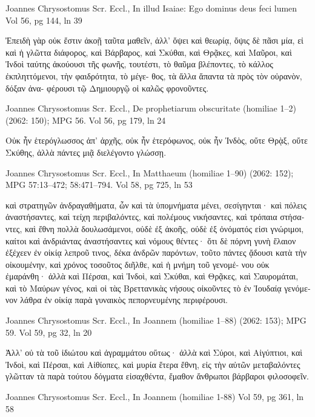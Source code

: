\documentclass[12pt,letterpaper,twoside,final]{memoir}
\begin{document}
\begin{greek}
Joannes Chrysostomus Scr. Eccl., In illud Isaiae: Ego dominus deus feci lumen 
Vol 56, pg 144, ln 39

                            Ἐπειδὴ γὰρ οὐκ ἔστιν ἀκοῇ 
ταῦτα μαθεῖν, ἀλλ' ὄψει καὶ θεωρίᾳ, ὄψις δὲ πᾶσι 
μία, εἰ καὶ ἡ γλῶττα διάφορος, καὶ Βάρβαρος, καὶ 
Σκύθαι, καὶ Θρᾷκες, καὶ Μαῦροι, καὶ Ἰνδοὶ ταύτης 
ἀκούουσι τῆς φωνῆς, τουτέστι, τὸ θαῦμα βλέποντες, 
τὸ κάλλος ἐκπληττόμενοι, τὴν φαιδρότητα, τὸ μέγε-
θος, τὰ ἄλλα ἅπαντα τὰ πρὸς τὸν οὐρανὸν, δόξαν ἀνα-
φέρουσι τῷ Δημιουργῷ οἱ καλῶς φρονοῦντες. 



Joannes Chrysostomus Scr. Eccl., De prophetiarum obscuritate (homiliae 1–2) (2062: 150); MPG 56.
Vol 56, pg 179, ln 24

                                   Οὐκ ἦν ἑτερόγλωσσος 
ἀπ' ἀρχῆς, οὐκ ἦν ἑτερόφωνος, οὐκ ἦν Ἰνδὸς, οὔτε 
Θρᾲξ, οὔτε Σκύθης, ἀλλὰ πάντες μιᾷ διελέγοντο 
γλώσσῃ. 



Joannes Chrysostomus Scr. Eccl., In Matthaeum (homiliae 1–90) (2062: 152); MPG 57:13–472; 58:471–794.
Vol 58, pg 725, ln 53

καὶ στρατηγῶν ἀνδραγαθήματα, ὧν καὶ τὰ ὑπομνήματα 
μένει, σεσίγηνται· καὶ πόλεις ἀναστήσαντες, καὶ τείχη 
περιβαλόντες, καὶ πολέμους νικήσαντες, καὶ τρόπαια 
στήσαντες, καὶ ἔθνη πολλὰ δουλωσάμενοι, οὐδὲ ἐξ ἀκοῆς, 
οὐδὲ ἐξ ὀνόματός εἰσι γνώριμοι, καίτοι καὶ ἀνδριάντας 
ἀναστήσαντες καὶ νόμους θέντες· ὅτι δὲ πόρνη γυνὴ 
ἔλαιον ἐξέχεεν ἐν οἰκίᾳ λεπροῦ τινος, δέκα ἀνδρῶν 
παρόντων, τοῦτο πάντες ᾄδουσι κατὰ τὴν οἰκουμένην, 
καὶ χρόνος τοσοῦτος διῆλθε, καὶ ἡ μνήμη τοῦ γενομέ-
νου οὐκ ἐμαράνθη· ἀλλὰ καὶ Πέρσαι, καὶ Ἰνδοὶ, 
καὶ Σκύθαι, καὶ Θρᾷκες, καὶ Σαυρομάται, καὶ 
τὸ Μαύρων γένος, καὶ οἱ τὰς Βρεττανικὰς νήσους 
οἰκοῦντες τὸ ἐν Ἰουδαίᾳ γενόμενον λάθρα ἐν οἰκίᾳ παρὰ 
γυναικὸς πεπορνευμένης περιφέρουσι. 



Joannes Chrysostomus Scr. Eccl., In Joannem (homiliae 1–88) (2062: 153); MPG 59.
Vol 59, pg 32, ln 20

                                                        Ἀλλ' οὐ 
τὰ τοῦ ἰδιώτου καὶ ἀγραμμάτου οὕτως· ἀλλὰ καὶ Σύροι, 
καὶ Αἰγύπτιοι, καὶ Ἰνδοὶ, καὶ Πέρσαι, καὶ Αἰθίοπες, καὶ 
μυρία ἕτερα ἔθνη, εἰς τὴν αὐτῶν μεταβαλόντες γλῶτταν 
τὰ παρὰ τούτου δόγματα εἰσαχθέντα, ἔμαθον ἄνθρωποι 
βάρβαροι φιλοσοφεῖν. 



Joannes Chrysostomus Scr. Eccl., In Joannem (homiliae 1-88) 
Vol 59, pg 361, ln 58


\end{greek}
\end{document}
